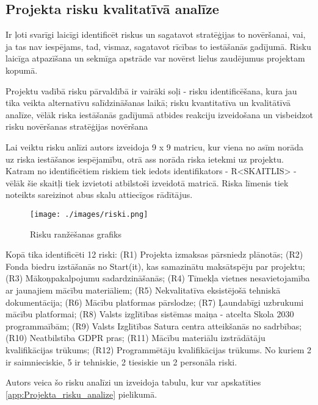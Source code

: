 \subsection{Projekta risku kvalitatīvā analīze}
Ir ļoti svarīgi laicīgi identificēt riskus un sagatavot stratēģijas to novēršanai, vai, ja tas nav
iespējams, tad, vismaz, sagatavot rīcības to iestāšanās gadījumā. Risku laicīga atpazīšana un 
sekmīga apstrāde var novērst lielus zaudējumus projektam kopumā.
\par
Projektu vadībā risku pārvaldībā ir vairāki soļi - risku identificēšana, kura jau tika veikta alternatīvu
salīdzināšanas laikā; risku kvantitatīva un kvalitātīvā analīze, vēlāk riska iestāšanās gadījumā atbides 
reakciju izveidošana un visbeidzot risku novēršanas stratēģijas novēršana
\par
Lai veiktu risku anlīzi autors izveidoja 9 x 9 matricu, kur viena no asīm norāda uz riska iestāšanos
iespējamību, otrā ass norāda riska ietekmi uz projektu. Katram no identificētiem riskiem
tiek iedots identifikators - R<SKAITLIS> - vēlāk šie skaitļi tiek izvietoti atbilstoši izveidotā matricā.
Riska līmenis tiek noteikts sareizinot abus skalu attiecīgos rādītājus.
\par
\begin{figure}[h!]
  \centering
  \texttt{[image: ./images/riski.png]}
  \label{image:riski}
  \caption{Risku ranžēšanas grafiks}
\end{figure}
\par
Kopā tika identificēti 12 riski: (R1) Projekta izmaksas pārsniedz plānotās; 
(R2) Fonda biedru izstāšanās no Start(it), kas samazinātu maksātspēju par projektu;
(R3) Mākoņpakalpojumu sadardzināšanās;
(R4) Tīmekļa vietnes nesavietojamība ar jaunajiem mācību materiāliem;
(R5) Nekvalitatīva eksistējošā tehniskā dokumentācija;
(R6) Mācību platformas pārslodze;
(R7) Ļaundabīgi uzbrukumi mācību platformai;
(R8) Valsts izglītības sistēmas maiņa - atcelta Skola 2030 programmaībām;
(R9) Valsts Izglītības Satura centra atteikšanās no sadrbības;
(R10) Neatbilstība GDPR pras;
(R11) Mācību materiālu izstrādātāju kvalifikācijas trūkums;
(R12) Programmētāju kvalifikācijas trūkums.
No kuriem 2 ir saimnieciskie, 5 ir tehniskie, 2 tiesiskie un 2 personāla riski.
\par
Autors veica šo risku analīzi un izveidoja tabulu, kur var apskatīties \ref{app:Projekta_risku_analize} pielikumā.
